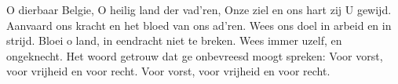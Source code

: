 \beginverse*
O dierbaar Belgie, O heilig land der vad'ren, Onze ziel en ons hart zij U gewijd.
Aanvaard ons kracht en het bloed van ons ad'ren. Wees ons doel in arbeid en in strijd.
Bloei o land, in eendracht niet te breken. Wees immer uzelf, en ongeknecht.
Het woord getrouw dat ge onbevreesd moogt spreken: Voor vorst, voor vrijheid en voor recht.
Voor vorst, voor vrijheid en voor recht.
\endverse
\endsong